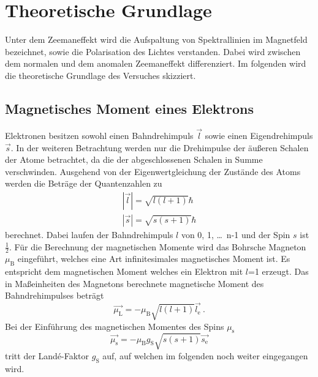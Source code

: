 \section{Theoretische Grundlage}
\label{sec:Theorie}
Unter dem Zeemaneffekt wird die Aufspaltung von Spektrallinien im Magnetfeld bezeichnet, sowie die Polarisation des Lichtes verstanden. Dabei wird zwischen dem normalen und dem anomalen Zeemaneffekt differenziert. Im folgenden wird die theoretische Grundlage des Versuches skizziert.

\subsection{Magnetisches Moment eines Elektrons}
Elektronen besitzen sowohl einen Bahndrehimpuls $\vec{l}$ sowie einen Eigendrehimpuls $\vec{s}$. In der weiteren Betrachtung werden nur die Drehimpulse der äußeren Schalen der Atome betrachtet, da die der abgeschlossenen Schalen in Summe verschwinden. Ausgehend von der Eigenwertgleichung der Zustände des Atoms werden die Beträge der Quantenzahlen zu
\begin{eqnarray}
  |\vec{l}| = \sqrt{l(l+1)} \hbar  \\
  |\vec{s}| = \sqrt{s(s+1)} \hbar
  \label{eqn:betQua}
\end{eqnarray}
berechnet. Dabei laufen der Bahndrehimpuls $l$ von 0, 1, \ldots $\,$ n-1 und der Spin $s$ ist $\frac{1}{2}$. Für die Berechnung der magnetischen Momente wird das Bohrsche Magneton $\mu_\text{B}$ eingeführt, welches eine Art infinitesimales magnetisches Moment ist. Es entspricht dem magnetischen Moment welches ein Elektron mit $l$=1 erzeugt. Das in Maßeinheiten des Magnetons berechnete magnetische Moment des Bahndrehimpulses beträgt
\begin{equation}
  \vec{\mu_\text{L}} = -\mu_\text{B} \sqrt{l(l+1)} \vec{l_\text{e}} \ .
  \label{eqn:magL}
\end{equation}
Bei der Einführung des magnetischen Momentes des Spins $\mu_\text{s}$
\begin{equation}
  \vec{\mu_\text{s}} = - \mu_\text{B} g_\text{S} \sqrt{s(s+1)} \vec{s_\text{e}}
  \label{eqn:magS}
\end{equation}
tritt der Landé-Faktor $g_\text{S}$ auf, auf welchen im folgenden noch weiter eingegangen wird.


